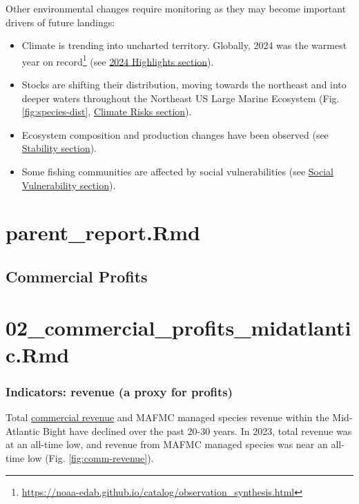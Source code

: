 \documentclass[
  10pt,
]{article}
\providecommand{\tightlist}{%
  \setlength{\itemsep}{0pt}\setlength{\parskip}{0pt}}
\begin{document}
Other environmental changes require monitoring as they may become important drivers of future landings:

\begin{itemize}
\tightlist
\item
  Climate is trending into uncharted territory. Globally, 2024 was the warmest year on record\footnote{\url{https://noaa-edab.github.io/catalog/observation_synthesis.html}} (see \hyperref[highlights]{2024 Highlights section}).
\item
  Stocks are shifting their distribution, moving towards the northeast and into deeper waters throughout the Northeast US Large Marine Ecosystem (Fig. \ref{fig:species-dist}, \hyperref[climate-risks]{Climate Risks section}).
\item
  Ecosystem composition and production changes have been observed (see \hyperref[stability]{Stability section}).
\item
  Some fishing communities are affected by social vulnerabilities (see \hyperref[social-vulnerability]{Social Vulnerability section}).
\end{itemize}

\newpage

\section{parent\_report.Rmd}\label{parent_report.rmd-2}

\subsection{Commercial Profits}\label{commercial-profits}

\section{02\_commercial\_profits\_midatlantic.Rmd}\label{commercial_profits_midatlantic.rmd}

\subsubsection{Indicators: revenue (a proxy for profits)}\label{indicators-revenue-a-proxy-for-profits}

Total \href{https://noaa-edab.github.io/catalog/comdat.html}{commercial revenue} and MAFMC managed species revenue within the Mid-Atlantic Bight have declined over the past 20-30 years. In 2023, total revenue was at an all-time low, and revenue from MAFMC managed species was near an all-time low (Fig. \ref{fig:comm-revenue}).
\end{document}
